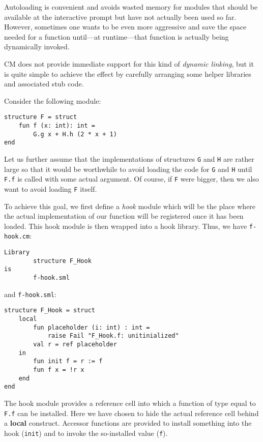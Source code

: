 \documentclass[titlepage,letterpaper]{article}
\begin{document}
Autoloading is convenient and avoids wasted memory for modules that
should be available at the interactive prompt but have not actually
been used so far.  However, sometimes one wants to be even more
aggressive and save the space needed for a function until---at
runtime---that function is actually being dynamically invoked.

CM does not provide immediate support for this kind of {\em dynamic
linking}, but it is quite simple to achieve the effect by carefully
arranging some helper libraries and associated stub code.

Consider the following module:
\begin{verbatim}
structure F = struct
    fun f (x: int): int =
        G.g x + H.h (2 * x + 1)
end
\end{verbatim}

Let us further assume that the implementations of structures {\tt G}
and {\tt H} are rather large so that it would be worthwhile to avoid
loading the code for {\tt G} and {\tt H} until {\tt F.f} is called
with some actual argument.  Of course, if {\tt F} were bigger, then we
also want to avoid loading {\tt F} itself.

To achieve this goal, we first define a {\em hook} module which will
be the place where the actual implementation of our function will be
registered once it has been loaded.  This hook module is then wrapped
into a hook library.  Thus, we have {\tt f-hook.cm}:
\begin{verbatim}
Library
        structure F_Hook
is
        f-hook.sml
\end{verbatim}

and {\tt f-hook.sml}:

\begin{verbatim}
structure F_Hook = struct
    local
        fun placeholder (i: int) : int =
            raise Fail "F_Hook.f: unitinialized"
        val r = ref placeholder
    in
        fun init f = r := f
        fun f x = !r x
    end
end
\end{verbatim}

The hook module provides a reference cell into which a function of
type equal to {\tt F.f} can be installed.  Here we have chosen to hide
the actual reference cell behind a {\bf local} construct.  Accessor
functions are provided to install something into the hook
({\tt init}) and to invoke the so-installed value ({\tt f}).
\end{document}
